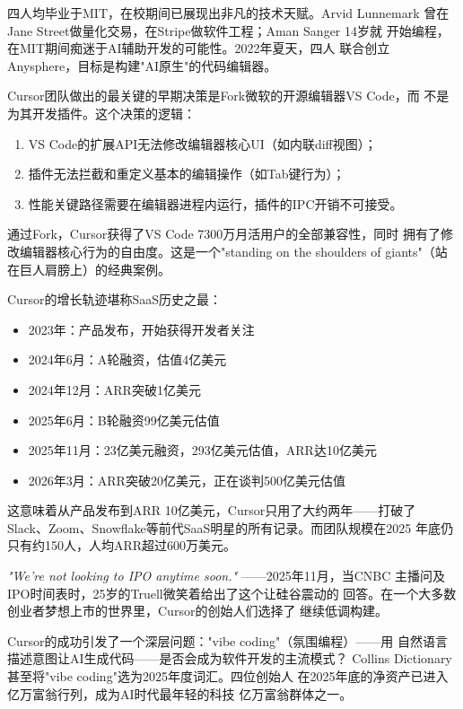 四人均毕业于MIT，在校期间已展现出非凡的技术天赋。Arvid Lunnemark
曾在Jane Street做量化交易，在Stripe做软件工程；Aman Sanger 14岁就
开始编程，在MIT期间痴迷于AI辅助开发的可能性。2022年夏天，四人
联合创立Anysphere，目标是构建"AI原生"的代码编辑器。

\begin{whybox}
Cursor团队做出的最关键的早期决策是Fork微软的开源编辑器VS Code，而
不是为其开发插件。这个决策的逻辑：
\begin{enumerate}
  \item VS Code的扩展API无法修改编辑器核心UI（如内联diff视图）；
  \item 插件无法拦截和重定义基本的编辑操作（如Tab键行为）；
  \item 性能关键路径需要在编辑器进程内运行，插件的IPC开销不可接受。
\end{enumerate}
通过Fork，Cursor获得了VS Code 7300万月活用户的全部兼容性，同时
拥有了修改编辑器核心行为的自由度。这是一个"standing on the shoulders
of giants"（站在巨人肩膀上）的经典案例。
\end{whybox}

Cursor的增长轨迹堪称SaaS历史之最：

\begin{itemize}
  \item 2023年：产品发布，开始获得开发者关注
  \item 2024年6月：A轮融资，估值4亿美元
  \item 2024年12月：ARR突破1亿美元
  \item 2025年6月：B轮融资99亿美元估值
  \item 2025年11月：23亿美元融资，293亿美元估值，ARR达10亿美元
  \item 2026年3月：ARR突破20亿美元，正在谈判500亿美元估值
\end{itemize}

这意味着从产品发布到ARR 10亿美元，Cursor只用了大约两年——打破了
Slack、Zoom、Snowflake等前代SaaS明星的所有记录。而团队规模在2025
年底仍只有约150人，人均ARR超过600万美元。

\begin{keybox}
\textit{"We're not looking to IPO anytime soon."} ——2025年11月，当CNBC
主播问及IPO时间表时，25岁的Truell微笑着给出了这个让硅谷震动的
回答。在一个大多数创业者梦想上市的世界里，Cursor的创始人们选择了
继续低调构建。
\end{keybox}

Cursor的成功引发了一个深层问题："vibe coding"（氛围编程）——用
自然语言描述意图让AI生成代码——是否会成为软件开发的主流模式？
Collins Dictionary甚至将"vibe coding"选为2025年度词汇。四位创始人
在2025年底的净资产已进入亿万富翁行列，成为AI时代最年轻的科技
亿万富翁群体之一。


